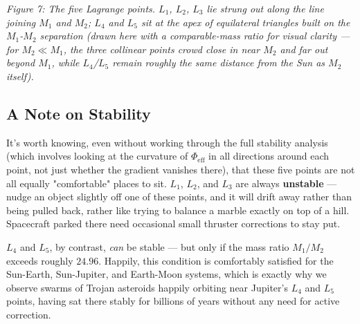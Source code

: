 \documentclass[11pt]{article}
\begin{document}
\begin{center}
\end{center}
\begin{center}\textit{Figure 7: The five Lagrange points. $L_1$, $L_2$, $L_3$ lie strung out
along the line joining $M_1$ and $M_2$; $L_4$ and $L_5$ sit at the apex of equilateral triangles
built on the $M_1$-$M_2$ separation (drawn here with a comparable-mass ratio for visual clarity
--- for $M_2\ll M_1$, the three collinear points crowd close in near $M_2$ and far out beyond
$M_1$, while $L_4$/$L_5$ remain roughly the same distance from the Sun as $M_2$ itself).}\end{center}

\subsection*{A Note on Stability}

It's worth knowing, even without working through the full stability analysis (which involves
looking at the curvature of $\Phi_{\text{eff}}$ in all directions around each point, not just
whether the gradient vanishes there), that these five points are not all equally "comfortable"
places to sit. $L_1$, $L_2$, and $L_3$ are always \textbf{unstable} --- nudge an object slightly
off one of these points, and it will drift away rather than being pulled back, rather like trying
to balance a marble exactly on top of a hill. Spacecraft parked there need occasional small
thruster corrections to stay put.

$L_4$ and $L_5$, by contrast, \emph{can} be stable --- but only if the mass ratio $M_1/M_2$
exceeds roughly $24.96$. Happily, this condition is comfortably satisfied for the Sun-Earth,
Sun-Jupiter, and Earth-Moon systems, which is exactly why we observe swarms of Trojan asteroids
happily orbiting near Jupiter's $L_4$ and $L_5$ points, having sat there stably for billions of
years without any need for active correction.
\end{document}
